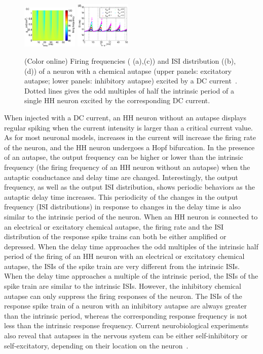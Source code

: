 \documentclass[twocolumn,showpacs,preprintnumbers,amsmath,amssymb,pre,superscriptaddress]{revtex4-1}
\begin{document}
\begin{CJK}{UTF8}{gbsn}
\begin{figure}
\begin{center}
\includegraphics[width=0.236\textwidth]{fig7c.eps}
\includegraphics[width=0.236\textwidth]{fig7d.eps}
\caption{(Color online) Firing frequencies ( (a),(c)) and ISI distribution ((b), (d)) of a neuron with a chemical autapse (upper panels: excitatory autapse; lower panels: inhibitory autapse) excited by a DC current~\cite{wht_chaos}. Dotted lines gives the odd multiples of half the intrinsic period of a single HH neuron excited by the corresponding DC current.} 
\label{dc5}
\end{center}
\end{figure}

When injected with a DC current, an HH neuron without an autapse displays regular spiking when the current intensity is larger than a critical current value. As for most neuronal models, increases in the current will increase the firing rate of the neuron, and the HH neuron undergoes a Hopf bifurcation. 
In the presence of an autapse, the output frequency can be higher or lower than the intrinsic frequency (the firing frequency of an HH neuron without an autapse) when the autaptic conductance and delay time are changed. Interestingly, the output frequency, as well as the output ISI distribution, shows periodic behaviors as the autaptic delay time increases. This periodicity of the changes in the output frequency (ISI distributions) in response to changes in the delay time is also similar to the intrinsic period of the neuron. When an HH neuron is connected to an electrical or excitatory chemical autapse, the firing rate and the ISI distribution of the response spike trains can both be either amplified or depressed. When the delay time approaches the odd multiples of the intrinsic half period of the firing of an HH neuron with an electrical or excitatory chemical autapse, the ISIs of the spike train are very different from the intrinsic ISIs. When the delay time approaches a multiple of the intrinsic period, the ISIs of the spike train are similar to the intrinsic ISIs. However, the inhibitory chemical autapse can only suppress the firing responses of the neuron. The ISIs of the response spike train of a neuron with an inhibitory autapse are always greater than the intrinsic period, whereas the corresponding response frequency is not less than the intrinsic response frequency. Current neurobiological experiments also reveal that autapses in the nervous system can be either self-inhibitory or self-excitatory, depending on their location on the neuron~\cite{Bekkers1998,bekkers2003,gulledge1,gulledge2}. 


\end{CJK}
\end{document}
